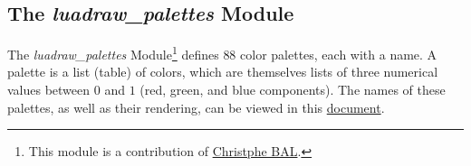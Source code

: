 \subsection{The \emph{luadraw\_palettes} Module}

The \emph{luadraw\_palettes} Module\footnote{This module is a contribution of \href{https://github.com/projetmbc/for-writing/tree/main/palcol}{Christphe BAL}.} defines $88$ color palettes, each with a name. A palette is a list (table) of colors, which are themselves lists of three numerical values ​​between $0$ and $1$ (red, green, and blue components). The names of these palettes, as well as their rendering, can be viewed in this \href{luadraw_palettes_doc.pdf}{document}.
